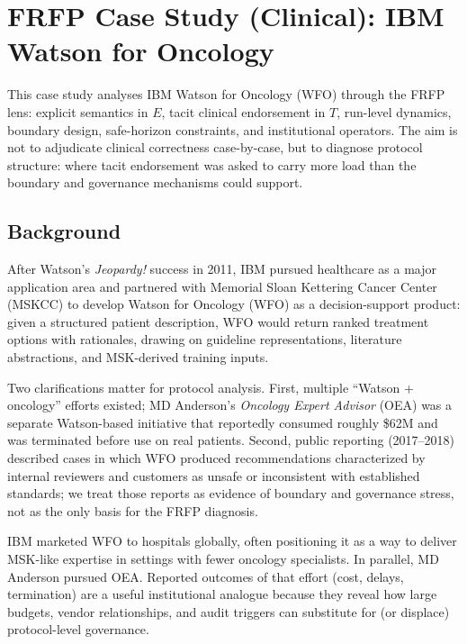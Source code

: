 
\section{FRFP Case Study (Clinical): IBM Watson for Oncology}
\label{app:frfp-watson-oncology}

This case study analyses IBM Watson for Oncology (WFO) through the FRFP lens: explicit semantics
in \(E\), tacit clinical endorsement in \(T\), run-level dynamics, boundary design, safe-horizon
constraints, and institutional operators. The aim is not to adjudicate clinical correctness
case-by-case, but to diagnose protocol structure: where tacit endorsement was asked to carry more
load than the boundary and governance mechanisms could support.

\subsection{Background}

After Watson’s \emph{Jeopardy!} success in 2011, IBM pursued healthcare as a major application
area and partnered with Memorial Sloan Kettering Cancer Center (MSKCC) to develop Watson for
Oncology (WFO) as a decision-support product: given a structured patient description, WFO would
return ranked treatment options with rationales, drawing on guideline representations, literature
abstractions, and MSK-derived training inputs.

Two clarifications matter for protocol analysis. First, multiple “Watson + oncology” efforts existed;
MD Anderson’s \emph{Oncology Expert Advisor} (OEA) was a separate Watson-based initiative that
reportedly consumed roughly \$62M and was terminated before use on real patients. Second, public
reporting (2017--2018) described cases in which WFO produced recommendations characterized by
internal reviewers and customers as unsafe or inconsistent with established standards; we treat
those reports as evidence of boundary and governance stress, not as the only basis for the FRFP
diagnosis.

IBM marketed WFO to hospitals globally, often positioning it as a way to deliver MSK-like expertise
in settings with fewer oncology specialists. In parallel, MD Anderson pursued OEA. Reported outcomes
of that effort (cost, delays, termination) are a useful institutional analogue because they reveal how
large budgets, vendor relationships, and audit triggers can substitute for (or displace) protocol-level
governance.

